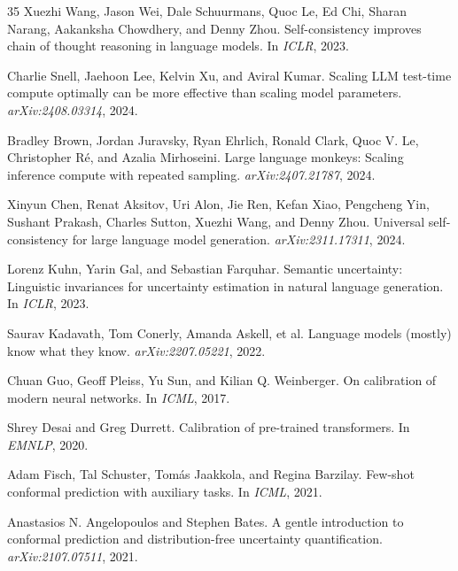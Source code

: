 \documentclass[11pt]{article}
\begin{document}
\begin{thebibliography}{35}
Xuezhi Wang, Jason Wei, Dale Schuurmans, Quoc Le, Ed Chi, Sharan Narang, Aakanksha Chowdhery, and Denny Zhou.
Self-consistency improves chain of thought reasoning in language models.
In \emph{ICLR}, 2023.

Charlie Snell, Jaehoon Lee, Kelvin Xu, and Aviral Kumar.
Scaling LLM test-time compute optimally can be more effective than scaling model parameters.
\emph{arXiv:2408.03314}, 2024.

Bradley Brown, Jordan Juravsky, Ryan Ehrlich, Ronald Clark, Quoc V. Le, Christopher R\'{e}, and Azalia Mirhoseini.
Large language monkeys: Scaling inference compute with repeated sampling.
\emph{arXiv:2407.21787}, 2024.

Xinyun Chen, Renat Aksitov, Uri Alon, Jie Ren, Kefan Xiao, Pengcheng Yin, Sushant Prakash, Charles Sutton, Xuezhi Wang, and Denny Zhou.
Universal self-consistency for large language model generation.
\emph{arXiv:2311.17311}, 2024.

Lorenz Kuhn, Yarin Gal, and Sebastian Farquhar.
Semantic uncertainty: Linguistic invariances for uncertainty estimation in natural language generation.
In \emph{ICLR}, 2023.

Saurav Kadavath, Tom Conerly, Amanda Askell, et al.
Language models (mostly) know what they know.
\emph{arXiv:2207.05221}, 2022.

Chuan Guo, Geoff Pleiss, Yu Sun, and Kilian Q. Weinberger.
On calibration of modern neural networks.
In \emph{ICML}, 2017.

Shrey Desai and Greg Durrett.
Calibration of pre-trained transformers.
In \emph{EMNLP}, 2020.

Adam Fisch, Tal Schuster, Tom{\'a}s Jaakkola, and Regina Barzilay.
Few-shot conformal prediction with auxiliary tasks.
In \emph{ICML}, 2021.

Anastasios N. Angelopoulos and Stephen Bates.
A gentle introduction to conformal prediction and distribution-free uncertainty quantification.
\emph{arXiv:2107.07511}, 2021.


\end{thebibliography}
\end{document}
